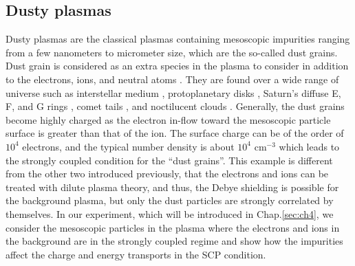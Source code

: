 \subsection{Dusty plasmas}
\label{sec:ch3-3-3}

Dusty plasmas are the classical plasmas containing mesoscopic impurities ranging from a few nanometers to micrometer size, which are the so-called dust grains. Dust grain is considered as an extra species in the plasma to consider in addition to the electrons, ions, and neutral atoms \cite{bellan2008fundamentals}. They are found over a wide range of universe such as interstellar medium \cite{zubko2004interstellar}, protoplanetary disks \cite{pollack1994composition, mcclure2012probing}, Saturn's diffuse E, F, and G rings \cite{goertz1989dusty}, comet tails \cite{davies1997detection}, and noctilucent clouds \cite{havnes1996first}. Generally, the dust grains become highly charged as the electron in-flow toward the mesoscopic particle surface is greater than that of the ion. The surface charge can be of the order of $10^4$ electrons, and the typical number density is about $10^4 \text{ cm}^{-3}$ which leads to the strongly coupled condition for the ``dust grains''. This example is different from the other two introduced previously, that the electrons and ions can be treated with dilute plasma theory, and thus, the Debye shielding is possible for the background plasma, but only the dust particles are strongly correlated by themselves. In our experiment, which will be introduced in Chap.\ref{sec:ch4}, we consider the mesoscopic particles in the plasma where the electrons and ions in the background are in the strongly coupled regime and show how the impurities affect the charge and energy transports in the SCP condition.
